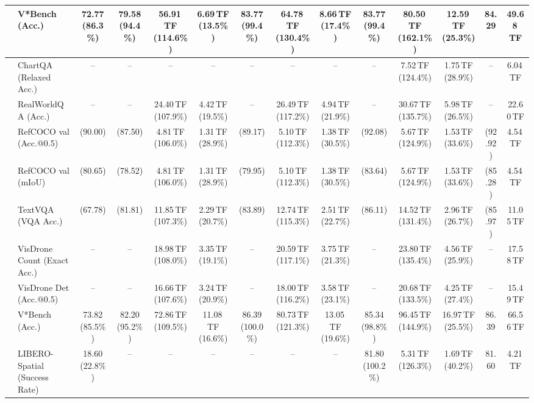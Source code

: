 \begin{table}[t]
\begin{center}
\begin{small}
\begin{sc}
{\begin{tabular}{llcccccccccccc}
& V*Bench (Acc.) & 72.77 (86.3\%) & 79.58 (94.4\%) & 56.91\,TF (114.6\%) & 6.69\,TF (13.5\%) & 83.77 (99.4\%) & 64.78\,TF (130.4\%) & 8.66\,TF (17.4\%) & 83.77 (99.4\%) & 80.50\,TF (162.1\%) & 12.59\,TF (25.3\%) & 84.29 & 49.68\,TF \\
\midrule
{}
& ChartQA (Relaxed Acc.) & -- & -- & -- & -- & -- & -- & -- & -- & 7.52\,TF (124.4\%) & 1.75\,TF (28.9\%) & -- & 6.04\,TF \\
& RealWorldQA (Acc.) & -- & -- & 24.40\,TF (107.9\%) & 4.42\,TF (19.5\%) & -- & 26.49\,TF (117.2\%) & 4.94\,TF (21.9\%) & -- & 30.67\,TF (135.7\%) & 5.98\,TF (26.5\%) & -- & 22.60\,TF \\
& RefCOCO val (Acc.@0.5) & (90.00) & (87.50) & 4.81\,TF (106.0\%) & 1.31\,TF (28.9\%) & (89.17) & 5.10\,TF (112.3\%) & 1.38\,TF (30.5\%) & (92.08) & 5.67\,TF (124.9\%) & 1.53\,TF (33.6\%) & (92.92) & 4.54\,TF \\
& RefCOCO val (mIoU) & (80.65) & (78.52) & 4.81\,TF (106.0\%) & 1.31\,TF (28.9\%) & (79.95) & 5.10\,TF (112.3\%) & 1.38\,TF (30.5\%) & (83.64) & 5.67\,TF (124.9\%) & 1.53\,TF (33.6\%) & (85.28) & 4.54\,TF \\
& TextVQA (VQA Acc.) & (67.78) & (81.81) & 11.85\,TF (107.3\%) & 2.29\,TF (20.7\%) & (83.89) & 12.74\,TF (115.3\%) & 2.51\,TF (22.7\%) & (86.11) & 14.52\,TF (131.4\%) & 2.96\,TF (26.7\%) & (85.97) & 11.05\,TF \\
& VisDrone Count (Exact Acc.) & -- & -- & 18.98\,TF (108.0\%) & 3.35\,TF (19.1\%) & -- & 20.59\,TF (117.1\%) & 3.75\,TF (21.3\%) & -- & 23.80\,TF (135.4\%) & 4.56\,TF (25.9\%) & -- & 17.58\,TF \\
& VisDrone Det (Acc.@0.5) & -- & -- & 16.66\,TF (107.6\%) & 3.24\,TF (20.9\%) & -- & 18.00\,TF (116.2\%) & 3.58\,TF (23.1\%) & -- & 20.68\,TF (133.5\%) & 4.25\,TF (27.4\%) & -- & 15.49\,TF \\
& V*Bench (Acc.) & 73.82 (85.5\%) & 82.20 (95.2\%) & 72.86\,TF (109.5\%) & 11.08\,TF (16.6\%) & 86.39 (100.0\%) & 80.73\,TF (121.3\%) & 13.05\,TF (19.6\%) & 85.34 (98.8\%) & 96.45\,TF (144.9\%) & 16.97\,TF (25.5\%) & 86.39 & 66.56\,TF \\
\midrule\midrule
{}
& LIBERO-Spatial (Success Rate) & 18.60 (22.8\%) & -- & -- & -- & -- & -- & -- & 81.80 (100.2\%) & 5.31\,TF (126.3\%) & 1.69\,TF (40.2\%) & 81.60 & 4.21\,TF \\

\end{tabular}}
\end{sc}
\end{small}
\end{center}
\end{table}
